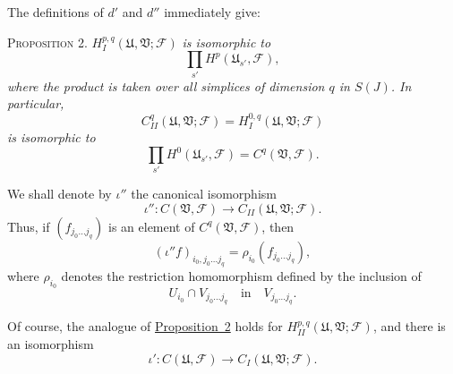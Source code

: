 The definitions of $d'$ and $d''$ immediately give:

\label{fac:I:4:no:28:prop:2}
\textsc{Proposition 2.} $H_I^{p,q}(\mathfrak{U},\mathfrak{V};\mathcal{F})$ \textit{is isomorphic to}
\[
\prod_{s'}H^p(\mathfrak{U}_{s'},\mathcal{F}),
\]
\textit{where the product is taken over all simplices of dimension $q$ in $S(J)$. In particular,}
\[
C_{II}^q(\mathfrak{U},\mathfrak{V};\mathcal{F})
=H_I^{0,q}(\mathfrak{U},\mathfrak{V};\mathcal{F})
\]
\textit{is isomorphic to}
\[
\prod_{s'}H^0(\mathfrak{U}_{s'},\mathcal{F})
=C^q(\mathfrak{V},\mathcal{F}).
\]

We shall denote by $\iota''$ the canonical isomorphism
\[
\iota'':C(\mathfrak{V},\mathcal{F})
\longrightarrow C_{II}(\mathfrak{U},\mathfrak{V};\mathcal{F}).
\]
Thus, if $(f_{j_0\ldots j_q})$ is an element of $C^q(\mathfrak{V},\mathcal{F})$, then
\[
(\iota''f)_{i_0,j_0\ldots j_q}
=\rho_{i_0}(f_{j_0\ldots j_q}),
\]
where $\rho_{i_0}$ denotes the restriction homomorphism defined by the inclusion of
\[
U_{i_0}\cap V_{j_0\ldots j_q}
\quad\text{in}\quad
V_{j_0\ldots j_q}.
\]

Of course, the analogue of \hyperref[fac:I:4:no:28:prop:2]{Proposition~2} holds for $H_{II}^{p,q}(\mathfrak{U},\mathfrak{V};\mathcal{F})$, and there is an isomorphism
\[
\iota':C(\mathfrak{U},\mathcal{F})
\longrightarrow C_I(\mathfrak{U},\mathfrak{V};\mathcal{F}).
\]
